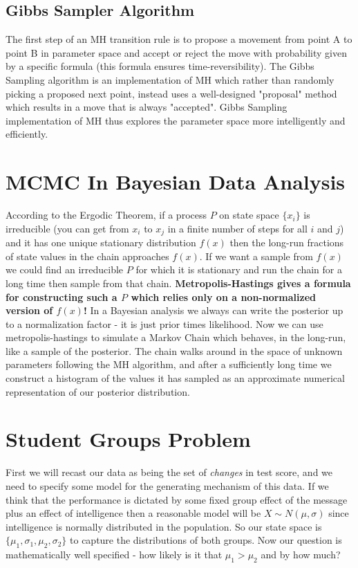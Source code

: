 \subsection{Gibbs Sampler Algorithm}
The first step of an MH transition rule is to propose a movement from point A to point B in parameter space and accept or reject the move with probability given by a specific formula (this formula ensures time-reversibility). The Gibbs Sampling algorithm is an implementation of MH which rather than randomly picking a proposed next point, instead uses a well-designed "proposal" method which results in a move that is always "accepted". Gibbs Sampling implementation of MH thus explores the parameter space more intelligently and efficiently. 

\section{MCMC In Bayesian Data Analysis}
According to the Ergodic Theorem, if a process $P$ on state space $\{x_i\}$ is irreducible (you can get from $x_i$ to $x_j$ in a finite number of steps for all $i$ and $j$) and it has one unique stationary distribution $f(x)$ then the long-run fractions of state values in the chain approaches $f(x)$. If we want a sample from $f(x)$ we could find an irreducible $P$ for which it is stationary and run the chain for a  long time then sample from that chain. \textbf{Metropolis-Hastings gives a formula for constructing such a $P$ which relies only on a non-normalized version of $f(x)$!} In a Bayesian analysis we always can write the posterior up to a normalization factor - it is just prior times likelihood. Now we can use metropolis-hastings to simulate a Markov Chain which behaves, in the long-run, like a sample of the posterior. The chain walks around in the space of unknown parameters following the MH algorithm, and after a sufficiently long time we construct a histogram of the values it has sampled as an approximate numerical representation of our posterior distribution. 

\section{Student Groups Problem}
First we will recast our data as being the set of \emph{changes} in test score, and we need to specify some model for the generating mechanism of this data. If we think that the performance is dictated by some fixed group effect of the message plus an effect of intelligence then a reasonable model will be $X\sim N(\mu, \sigma)$ since intelligence is normally distributed in the population. So our state space is $\{\mu_1, \sigma_1, \mu_2, \sigma_2\}$ to capture the distributions of both groups. Now our question is mathematically well specified - how likely is it that $\mu_1 > \mu_2$ and by how much? 
\newline

